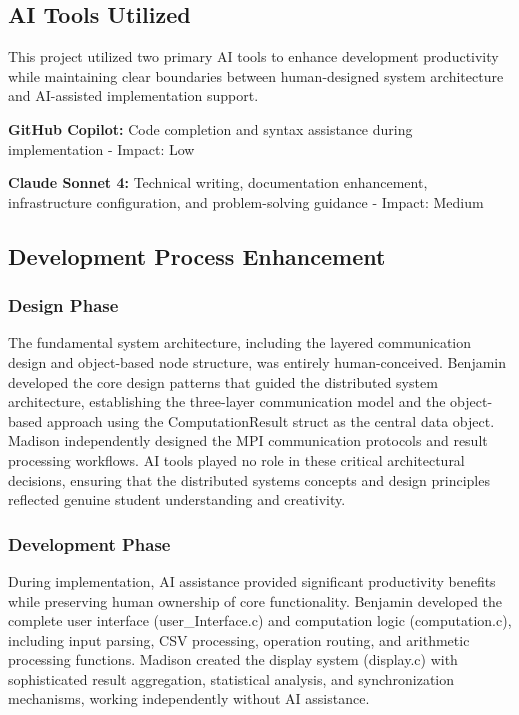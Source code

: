 \documentclass{article}
\begin{document}
\subsection{AI Tools Utilized}

This project utilized two primary AI tools to enhance development productivity while maintaining clear boundaries between human-designed system architecture and AI-assisted implementation support.

\textbf{GitHub Copilot:} Code completion and syntax assistance during implementation - Impact: Low

\textbf{Claude Sonnet 4:} Technical writing, documentation enhancement, infrastructure configuration, and problem-solving guidance - Impact: Medium

\subsection{Development Process Enhancement}

\subsubsection{Design Phase}
The fundamental system architecture, including the layered communication design and object-based node structure, was entirely human-conceived. Benjamin developed the core design patterns that guided the distributed system architecture, establishing the three-layer communication model and the object-based approach using the ComputationResult struct as the central data object. Madison independently designed the MPI communication protocols and result processing workflows. AI tools played no role in these critical architectural decisions, ensuring that the distributed systems concepts and design principles reflected genuine student understanding and creativity.

\subsubsection{Development Phase}
During implementation, AI assistance provided significant productivity benefits while preserving human ownership of core functionality. Benjamin developed the complete user interface (user\_Interface.c) and computation logic (computation.c), including input parsing, CSV processing, operation routing, and arithmetic processing functions. Madison created the display system (display.c) with sophisticated result aggregation, statistical analysis, and synchronization mechanisms, working independently without AI assistance.
\end{document}
